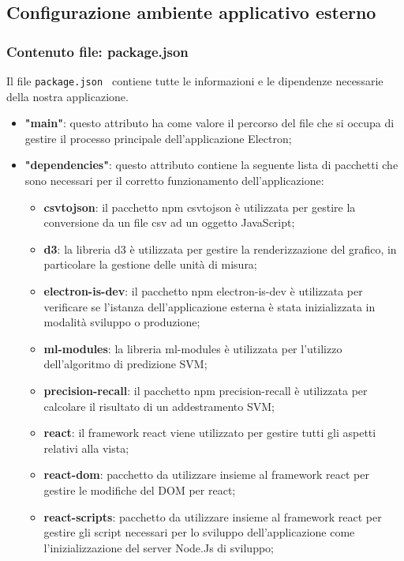 \subsection{Configurazione ambiente applicativo esterno}
\subsubsection{Contenuto file: package.json}
Il file \verb|package.json | contiene tutte le informazioni e le dipendenze necessarie della nostra applicazione.
\begin{itemize}
    \item \textbf{"main"}: questo attributo ha come valore il percorso del file che si occupa di gestire il processo principale dell'applicazione Electron;
    \item \textbf{"dependencies"}: questo attributo contiene la seguente lista di pacchetti che sono necessari per il corretto funzionamento dell'applicazione:
        \begin{itemize}
            \item \textbf{csvtojson}: il pacchetto npm csvtojson è utilizzata per gestire la conversione da un file csv ad un oggetto JavaScript;
            \item \textbf{d3}: la libreria d3 è utilizzata per gestire la renderizzazione del grafico, in particolare la gestione delle unità di misura;
            \item \textbf{electron-is-dev}: il pacchetto npm electron-is-dev è utilizzata per verificare se l'istanza dell'applicazione esterna è stata inizializzata in modalità sviluppo o produzione;
            \item \textbf{ml-modules}: la libreria ml-modules è utilizzata per l'utilizzo dell'algoritmo di predizione SVM\glo;
            \item \textbf{precision-recall}: il pacchetto npm precision-recall è utilizzata per calcolare il risultato di un addestramento SVM\glo;
            \item \textbf{react}: il framework react viene utilizzato per gestire tutti gli aspetti relativi alla vista;
            \item \textbf{react-dom}: pacchetto da utilizzare insieme al framework react per gestire le modifiche del DOM per react;
            \item \textbf{react-scripts}: pacchetto da utilizzare insieme al framework react per gestire gli script necessari per lo sviluppo dell'applicazione come l'inizializzazione del server Node.Js di sviluppo;

\end{itemize}
\end{itemize}
